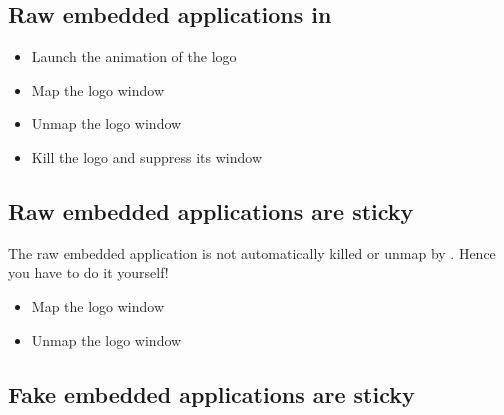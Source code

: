 \documentclass[12pt]{article}
\begin{document}
\newpage

\subsection* {Raw embedded applications in {\ActiveDVI}}

 {\centerline{}}
 
 {\adviunmapembed[advilogo]}

 {\advimapembed[advilogo]}

 {}

\begin{itemize}
\item {}%
  {Launch the animation of the {\ActiveDVI} logo}
\item {}
  {Map the {\ActiveDVI} logo window}
\item {}
  {Unmap the {\ActiveDVI} logo window}
\item {}%
  {Kill the {\ActiveDVI} logo and suppress its window}
\end{itemize}

\adviwait {}

\newpage

\subsection* {Raw embedded applications are sticky}

The raw embedded application is not automatically killed or unmap by
{\ActiveDVI}. Hence you have to do it yourself!

 {\adviunmapembed[advilogo]}

 {\advimapembed[advilogo]}

\begin{itemize}
\item {}
  {Map the {\ActiveDVI} logo window}
\item {}
  {Unmap the {\ActiveDVI} logo window}
\end{itemize}

\adviwait {}

\newpage

\subsection* {Fake embedded applications are sticky}
\end{document}
